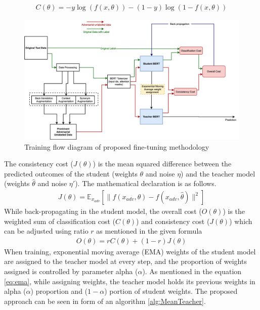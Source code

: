\documentclass[%
	BCOR=8mm, %
	DIV=12,
	toc=bibliography, %
	toc=listof, %
	oneside, %
	egregdoesnotlikesansseriftitles, %
	]{scrbook}
\begin{document}
\begin{equation}
    \begin{aligned}
        C( \theta )=-y \log (f(x,\theta))-(1-y) \log(1-f(x,\theta))
        \label{eq:classification_cost}
    \end{aligned}
\end{equation}
 \begin{figure}[h!]
    \centering
    \includegraphics[width=1.1\textwidth]{img/Methodology.png}
    \caption[Training flow diagram of proposed fine-tuning approach]{Training flow diagram of proposed fine-tuning methodology }
    \label{diag:advMTBERT}
\end{figure}
The consistency cost ($J(\theta)$)  is the mean squared difference between the predicted outcomes of the student (weights $\theta$ and noise $\eta$) and the teacher model (weights $\hat\theta$ and noise $\eta'$).  The mathematical declaration is as follows. 
\begin{equation}
    \begin{aligned}
        J( \theta )=\mathbb{E}_{x_{adv}}[\|f(x_{adv},\theta)-f(x_{adv},\hat\theta)\|^2]
        \label{eq:ADVconsistencycost}
    \end{aligned}
\end{equation}
While back-propagating in the student model, the overall cost ($\textit{O}(\theta)$) is the weighted sum of classification cost ($C(\theta)$)  and consistency cost ($J(\theta)$) which can be adjusted using ratio $r$ as mentioned in the given formula 
 \begin{equation}
     \begin{aligned}
         \textit{O}(\theta)= r C(\theta)+(1-r)J(\theta)
         \label{eq:overallcost}
         \end{aligned}
   \end{equation}
   When training, exponential moving average (EMA) weights of the student model are assigned to the teacher model at every step, and the proportion of weights assigned is controlled by parameter alpha ($\alpha$). As mentioned in the equation \ref{eq:ema}, while assigning weights, the teacher model holds its previous weights in alpha ($\alpha$) proportion and ($1-\alpha$) portion of student weights. The proposed approach can be seen in form of an algorithm \ref{alg:MeanTeacher}.
\end{document}
